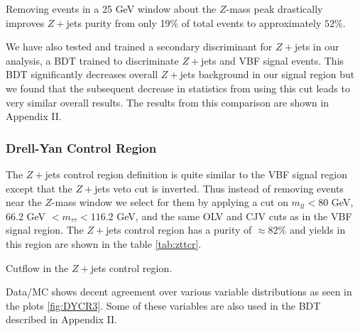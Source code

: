 Removing events in a 25 GeV window about the $Z$-mass peak drastically improves $Z+$jets purity from only 19$\%$ of total events to approximately $52\%$. 

We have also tested and trained a secondary discriminant for $Z+$jets in our analysis, a BDT trained to discriminate $Z+$jets and VBF signal events. This BDT significantly decreases overall $Z+$jets background in our signal region but we found that the subsequent decrease in statistics from using this cut leads to very similar overall results. The results from this comparison are shown in Appendix II. 

\subsubsection{Drell-Yan Control Region}

The $Z+$jets control region definition is quite similar to the VBF signal region except that the $Z+$jets veto cut is inverted. Thus instead of removing events near the $Z$-mass window we select for them by applying a cut on $m_{ll}<80$ GeV,  66.2 GeV $< m_{\tau\tau}< 116.2$ GeV, and the same OLV and CJV cuts as in the VBF signal region. The $Z+$jets control region has a purity of $\approx 82\%$ and yields in this region are shown in the table \ref{tab:zttcr}.

\begin{table}[h!]
\scalebox{0.55}{

}
\caption{Cutflow in the $Z+$jets control region.}
\label{tab:zttcr}
\end{table}

Data/MC shows decent agreement over various variable distributions as seen in the plots \ref{fig:DYCR3}. Some of these variables are also used in the BDT described in Appendix II. 

